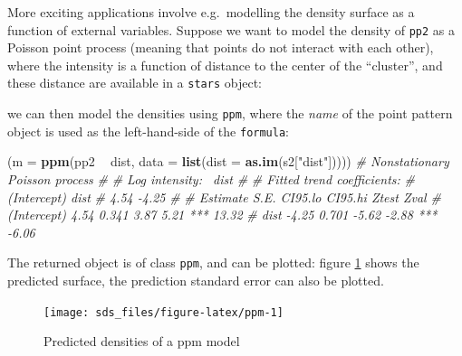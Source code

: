 \documentclass[]{book}
\newenvironment{Shaded}{\begin{snugshade}}{\end{snugshade}}
\newcommand{\CommentTok}[1]{\textcolor[rgb]{0.56,0.35,0.01}{\textit{#1}}}
\newcommand{\DataTypeTok}[1]{\textcolor[rgb]{0.13,0.29,0.53}{#1}}
\newcommand{\FloatTok}[1]{\textcolor[rgb]{0.00,0.00,0.81}{#1}}
\newcommand{\KeywordTok}[1]{\textcolor[rgb]{0.13,0.29,0.53}{\textbf{#1}}}
\newcommand{\NormalTok}[1]{#1}
\newcommand{\OperatorTok}[1]{\textcolor[rgb]{0.81,0.36,0.00}{\textbf{#1}}}
\newcommand{\OtherTok}[1]{\textcolor[rgb]{0.56,0.35,0.01}{#1}}
\newcommand{\StringTok}[1]{\textcolor[rgb]{0.31,0.60,0.02}{#1}}
\begin{document}
More exciting applications involve e.g.~modelling the density
surface as a function of external variables. Suppose we want
to model the density of \texttt{pp2} as a Poisson point process (meaning
that points do not interact with each other), where
the intensity is a function of distance to the center of the
``cluster'', and these distance are available in a \texttt{stars} object:

\begin{Shaded}
\end{Shaded}

we can then model the densities using \texttt{ppm}, where the \emph{name} of the
point pattern object is used as the left-hand-side of the \texttt{formula}:

\begin{Shaded}
\begin{Highlighting}[]
\NormalTok{(}\DataTypeTok{m =} \KeywordTok{ppm}\NormalTok{(pp2 }\OperatorTok{~}\StringTok{ }\NormalTok{dist, }\DataTypeTok{data =} \KeywordTok{list}\NormalTok{(}\DataTypeTok{dist =} \KeywordTok{as.im}\NormalTok{(s2[}\StringTok{"dist"}\NormalTok{]))))}
\CommentTok{# Nonstationary Poisson process}
\CommentTok{# }
\CommentTok{# Log intensity:  ~dist}
\CommentTok{# }
\CommentTok{# Fitted trend coefficients:}
\CommentTok{# (Intercept)        dist }
\CommentTok{#        4.54       -4.25 }
\CommentTok{# }
\CommentTok{#             Estimate  S.E. CI95.lo CI95.hi Ztest  Zval}
\CommentTok{# (Intercept)     4.54 0.341    3.87    5.21   *** 13.32}
\CommentTok{# dist           -4.25 0.701   -5.62   -2.88   *** -6.06}
\end{Highlighting}
\end{Shaded}

The returned object is of class \texttt{ppm}, and can be plotted: figure \ref{fig:ppm}
shows the predicted surface, the prediction standard error can also be plotted.

\begin{figure}

{\centering \texttt{[image: sds\_files/figure-latex/ppm-1]} 

}

\caption{Predicted densities of a ppm model}\label{fig:ppm}
\end{figure}
\end{document}

